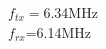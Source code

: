 \documentclass[preview]{standalone}
\begin{document}
\begin{center}
$f_{tx}=$6.34MHz\\$f_{rx}$=6.14MHz
\end{center}
\end{document}
